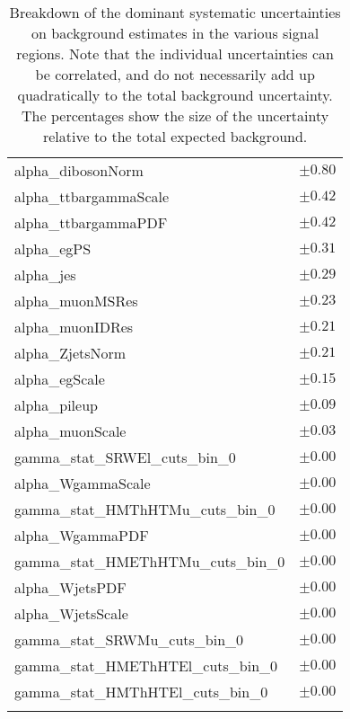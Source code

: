 \begin{table}
\begin{center}
\begin{tabular*}{\textwidth}{@{\extracolsep{\fill}}lc}
alpha\_dibosonNorm         & $\pm 0.80$       \\
alpha\_ttbargammaScale         & $\pm 0.42$       \\
alpha\_ttbargammaPDF         & $\pm 0.42$       \\
alpha\_egPS         & $\pm 0.31$       \\
alpha\_jes         & $\pm 0.29$       \\
alpha\_muonMSRes         & $\pm 0.23$       \\
alpha\_muonIDRes         & $\pm 0.21$       \\
alpha\_ZjetsNorm         & $\pm 0.21$       \\
alpha\_egScale         & $\pm 0.15$       \\
alpha\_pileup         & $\pm 0.09$       \\
alpha\_muonScale         & $\pm 0.03$       \\
gamma\_stat\_SRWEl\_cuts\_bin\_0         & $\pm 0.00$       \\
alpha\_WgammaScale         & $\pm 0.00$       \\
gamma\_stat\_HMThHTMu\_cuts\_bin\_0         & $\pm 0.00$       \\
alpha\_WgammaPDF         & $\pm 0.00$       \\
gamma\_stat\_HMEThHTMu\_cuts\_bin\_0         & $\pm 0.00$       \\
alpha\_WjetsPDF         & $\pm 0.00$       \\
alpha\_WjetsScale         & $\pm 0.00$       \\
gamma\_stat\_SRWMu\_cuts\_bin\_0         & $\pm 0.00$       \\
gamma\_stat\_HMEThHTEl\_cuts\_bin\_0         & $\pm 0.00$       \\
gamma\_stat\_HMThHTEl\_cuts\_bin\_0         & $\pm 0.00$       \\
\noalign{\smallskip}\hline\noalign{\smallskip}
\end{tabular*}
\end{center}
\caption[Breakdown of uncertainty on background estimates]{
Breakdown of the dominant systematic uncertainties on background estimates in the various signal regions.
Note that the individual uncertainties can be correlated, and do not necessarily add up quadratically to 
the total background uncertainty. The percentages show the size of the uncertainty relative to the total expected background.
\label{table.results.bkgestimate.uncertainties.WCRhHT}}
\end{table}
%